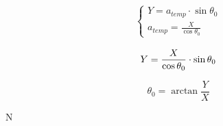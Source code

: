 \documentclass[a4paper,13pt]{article}
\begin{document}
\begin{equation}
\begin{split}
\begin{cases}
Y = a_{temp} \cdot \sin{\theta_0}\\
a_{temp} = \frac{X}{\cos{\theta_0}}
\end{cases}
\end{split}
\end{equation}


\begin{equation}
Y = \frac{X}{\cos{\theta_0}} \cdot \sin{\theta_0}\\
\end{equation}

\begin{equation}
\theta_0 = \arctan{\frac{Y}{X}}
\end{equation}








N%


\end{document}
